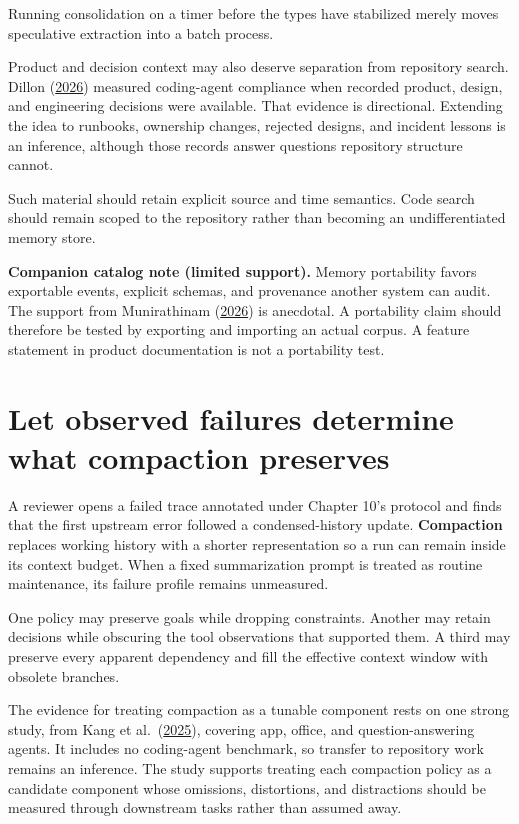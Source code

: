 Running consolidation on a timer before the types have stabilized merely moves speculative extraction into a batch process.

Product and decision context may also deserve separation from repository search. Dillon (\href{https://arxiv.org/abs/2605.08112}{2026}) measured coding-agent compliance when recorded product, design, and engineering decisions were available. That evidence is directional. Extending the idea to runbooks, ownership changes, rejected designs, and incident lessons is an inference, although those records answer questions repository structure cannot.

Such material should retain explicit source and time semantics. Code search should remain scoped to the repository rather than becoming an undifferentiated memory store.

\textbf{Companion catalog note (limited support).} Memory portability favors exportable events, explicit schemas, and provenance another system can audit. The support from Munirathinam (\href{https://arxiv.org/abs/2606.01138}{2026}) is anecdotal. A portability claim should therefore be tested by exporting and importing an actual corpus. A feature statement in product documentation is not a portability test.

\hypertarget{let-observed-failures-determine-what-compaction-preserves}{%
\section{Let observed failures determine what compaction preserves}\label{let-observed-failures-determine-what-compaction-preserves}}

A reviewer opens a failed trace annotated under Chapter 10's protocol and finds that the first upstream error followed a condensed-history update. \textbf{Compaction} replaces working history with a shorter representation so a run can remain inside its context budget. When a fixed summarization prompt is treated as routine maintenance, its failure profile remains unmeasured.

One policy may preserve goals while dropping constraints. Another may retain decisions while obscuring the tool observations that supported them. A third may preserve every apparent dependency and fill the effective context window with obsolete branches.

The evidence for treating compaction as a tunable component rests on one strong study, from Kang et al.~(\href{https://arxiv.org/abs/2510.00615}{2025}), covering app, office, and question-answering agents. It includes no coding-agent benchmark, so transfer to repository work remains an inference. The study supports treating each compaction policy as a candidate component whose omissions, distortions, and distractions should be measured through downstream tasks rather than assumed away.

